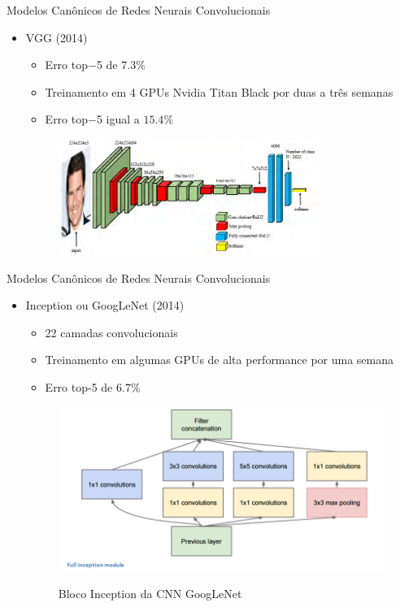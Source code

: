 \begin{frame}{\LARGE{Modelos Canônicos de Redes Neurais Convolucionais}}
   \ \  \\[0.1cm]
   \begin{itemize}
     \item VGG (2014)
     \begin{itemize}
       \item Erro top$-$5 de $7.3\%$
       \item Treinamento em 4 GPUs Nvidia Titan Black por duas a três semanas
       \item Erro top$-$5 igual a $15.4\%$
     \end{itemize}
     \begin{figure}
          \centering
          \includegraphics[width=0.8\textwidth]{img/vgg}
     \end{figure}
   \end{itemize}
\end{frame}

\begin{frame}{\LARGE{Modelos Canônicos de Redes Neurais Convolucionais}}
   \ \  \\[0.1cm]
   \begin{itemize}
     \item Inception ou GoogLeNet (2014)
     \begin{itemize}
       \item 22 camadas convolucionais
       \item Treinamento em algumas GPUs de alta performance por uma semana
       \item Erro top-5 de $6.7\%$
     \end{itemize}
     \begin{figure}[h!]
     	\centering
     	\caption{Bloco Inception da CNN GoogLeNet}
     	\includegraphics[width=0.7\linewidth]{img/GoogLeNet}
     	\label{fig:bloco_inception}
     \end{figure}
   \end{itemize}
\end{frame}

